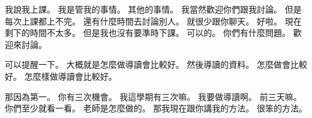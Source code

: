 \hypertarget{w01:cue:2657}{}我說我上課。
\hypertarget{w01:cue:2658}{}我是管我的事情。
\hypertarget{w01:cue:2659}{}其他的事情。
\hypertarget{w01:cue:2660}{}我當然歡迎你們跟我討論。
\hypertarget{w01:cue:2661}{}但是每次上課都上不完。
\hypertarget{w01:cue:2662}{}還有什麼時間去討論別人。
\hypertarget{w01:cue:2663}{}就很少跟你聊天。
\hypertarget{w01:cue:2664}{}好啦。
\hypertarget{w01:cue:2665}{}現在剩下的時間不太多。
\hypertarget{w01:cue:2666}{}但是我也沒有要準時下課。
\hypertarget{w01:cue:2667}{}可以的。
\hypertarget{w01:cue:2668}{}你們有什麼問題。
\hypertarget{w01:cue:2669}{}歡迎來討論。

\hypertarget{w01:cue:2670}{}可以提醒一下。
\hypertarget{w01:cue:2671}{}大概就是怎麼做導讀會比較好。
\hypertarget{w01:cue:2672}{}然後導讀的資料。
\hypertarget{w01:cue:2673}{}怎麼做會比較好。
\hypertarget{w01:cue:2674}{}怎麼樣做導讀會比較好。

\hypertarget{w01:cue:2675}{}那因為第一。
\hypertarget{w01:cue:2676}{}你有三次機會。
\hypertarget{w01:cue:2677}{}我這學期有三次嘛。
\hypertarget{w01:cue:2678}{}我要做導讀啊。
\hypertarget{w01:cue:2679}{}前三天嘛。
\hypertarget{w01:cue:2680}{}你們至少就看一看。
\hypertarget{w01:cue:2681}{}老師是怎麼做的。
\hypertarget{w01:cue:2682}{}那我現在跟你講我的方法。
\hypertarget{w01:cue:2683}{}很笨的方法。


